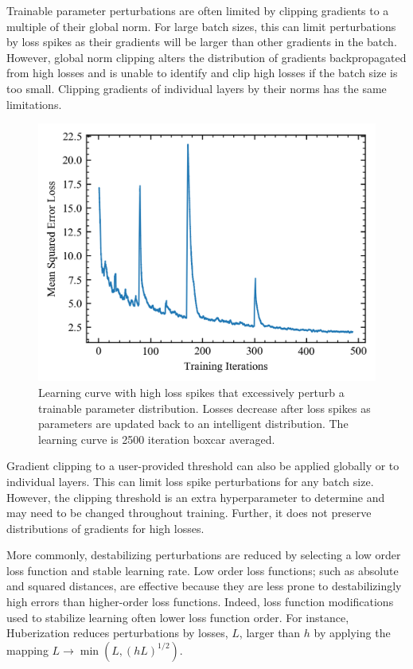 \documentclass[letterpaper, 10 pt, conference]{ieeeconf}  %
\begin{document}
Trainable parameter perturbations are often limited by clipping gradients to a multiple of their global norm\cite{bengio2012difficulty}. For large batch sizes, this can limit perturbations by loss spikes as their gradients will be larger than other gradients in the batch. However, global norm clipping alters the distribution of gradients backpropagated from high losses and is unable to identify and clip high losses if the batch size is too small. Clipping gradients of individual layers by their norms has the same limitations. 

\begin{figure}[tbp]
\centering
\includegraphics[width=0.97\columnwidth]{loss_spikes.png}
\caption{ Learning curve with high loss spikes that excessively perturb a trainable parameter distribution. Losses decrease after loss spikes as parameters are updated back to an intelligent distribution. The learning curve is 2500 iteration boxcar averaged. }
\label{loss_spikes}
\end{figure}

Gradient clipping to a user-provided threshold can also be applied globally or to individual layers. This can limit loss spike perturbations for any batch size. However, the clipping threshold is an extra hyperparameter to determine and may need to be changed throughout training. Further, it does not preserve distributions of gradients for high losses. 

More commonly, destabilizing perturbations are reduced by selecting a low order loss function and stable learning rate. Low order loss functions; such as absolute and squared distances, are effective because they are less prone to destabilizingly high errors than higher-order loss functions. Indeed, loss function modifications used to stabilize learning often lower loss function order. For instance, Huberization \cite{huber1964robust} reduces perturbations by losses, $L$, larger than $h$ by applying the mapping $L \rightarrow \min(L,(hL)^{1/2})$.
\end{document}
